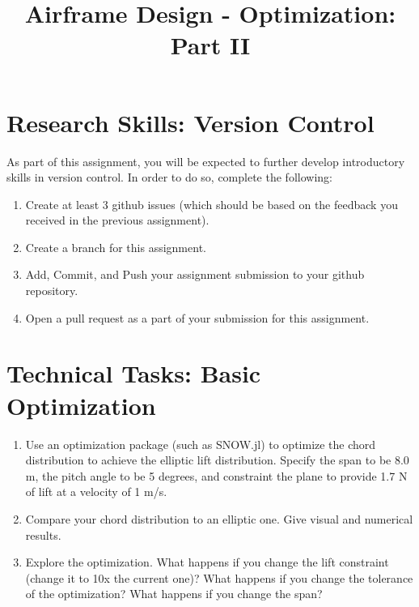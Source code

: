 \documentclass[11pt]{article}
\title{Airframe Design - Optimization: Part II}
\date{}
\begin{document}
	
\maketitle
\vspace{-2cm}

\section{Research Skills: Version Control}

As part of this assignment, you will be expected to further develop introductory skills in version control.
In order to do so, complete the following:
\begin{enumerate}[label=\alph*.]
	\item Create at least 3 github issues (which should be based on the feedback you received in the previous assignment).
	\item Create a branch for this assignment.
	\item Add, Commit, and Push your assignment submission to your github repository.
	\item Open a pull request as a part of your submission for this assignment.
\end{enumerate}

	



\section{Technical Tasks: Basic Optimization}
	


\begin{enumerate}[label=\alph*.]
	\item Use an optimization package (such as SNOW.jl) to optimize the chord distribution to achieve the elliptic lift distribution. Specify the span to be 8.0 m, the pitch angle to be 5 degrees, and constraint the plane to provide 1.7 N of lift at a velocity of 1 m/s.
	\item Compare your chord distribution to an elliptic one. Give visual and numerical results.
	\item Explore the optimization. What happens if you change the lift constraint (change it to 10x the current one)? What happens if you change the tolerance of the optimization? What happens if you change the span?
\end{enumerate}
	
\end{document}

